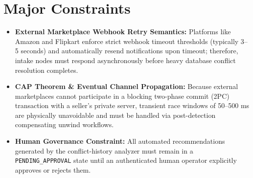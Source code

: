 \documentclass[oneside,a4paper,12pt]{report}
\begin{document}
\section{Major Constraints}
\begin{itemize}
  \item \textbf{External Marketplace Webhook Retry Semantics:} Platforms like Amazon and Flipkart enforce strict webhook timeout thresholds (typically 3--5 seconds) and automatically resend notifications upon timeout; therefore, intake nodes must respond asynchronously before heavy database conflict resolution completes.
  \item \textbf{CAP Theorem \& Eventual Channel Propagation:} Because external marketplaces cannot participate in a blocking two-phase commit (2PC) transaction with a seller's private server, transient race windows of 50--500 ms are physically unavoidable and must be handled via post-detection compensating unwind workflows.
  \item \textbf{Human Governance Constraint:} All automated recommendations generated by the conflict-history analyzer must remain in a \texttt{PENDING\_APPROVAL} state until an authenticated human operator explicitly approves or rejects them.
\end{itemize}
\end{document}
